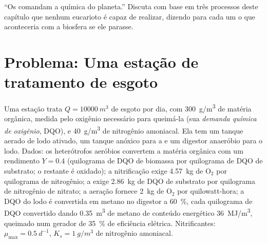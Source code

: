\begin{exercise}[$\star\star\star$]\label{exo:b2:microbial-metabolism:12}
``Os  comandam a química do planeta.'' Discuta com base em
três processos deste capítulo que nenhum eucarioto é capaz de
realizar, dizendo para cada um o que aconteceria com a biosfera se ele
parasse.
\end{exercise}

\section{Problema: Uma estação de tratamento de esgoto}

\begin{problem}
\label{pb:b2:microbial-metabolism:1}
Uma estação trata $Q = \qty{10000}{m^3}$ de esgoto por dia, com
\qty{300}{g/m^3} de matéria orgânica, medida pelo oxigênio necessário
para queimá-la (sua \emph{demanda química de oxigênio}, DQO), e
\qty{40}{g/m^3} de nitrogênio amoniacal. Ela tem um tanque aerado de
lodo ativado, um tanque anóxico para a  e um digestor
anaeróbio para o lodo. Dados: os heterótrofos aeróbios convertem a
matéria orgânica com um rendimento $Y = 0.4$ (quilograma de DQO de
biomassa por quilograma de DQO de substrato; o restante é oxidado);
a nitrificação exige \qty{4.57}{kg} de $\mathrm{O_2}$ por quilograma de
nitrogênio; a  exige \qty{2.86}{kg} de DQO de substrato
por quilograma de nitrogênio de nitrato; a aeração fornece \qty{2}{kg}
de $\mathrm{O_2}$ por quilowatt-hora; a DQO do lodo é convertida em
metano no digestor a \qty{60}{\%}, cada quilograma de DQO convertido
dando \qty{0.35}{m^3} de metano de conteúdo energético
\qty{36}{MJ/m^3}, queimado num gerador de \qty{35}{\%} de eficiência
elétrica. Nitrificantes: $\mu_{\max} = \qty{0.5}{d^{-1}}$, $K_s =
\qty{1}{g/m^3}$ de nitrogênio amoniacal.


\end{problem}
